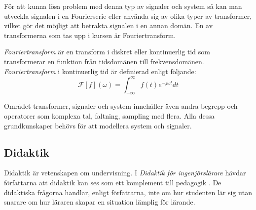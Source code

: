 \documentclass[12pt,a4paper,twoside,openright]{article}
\begin{document}
För att kunna lösa problem med denna typ av signaler och system så kan
man utveckla signalen i en Fourierserie eller använda sig av olika
typer av transformer, vilket gör det möjligt att betrakta signalen i
en annan domän. %
En av transformerna som tas upp i kursen är Fouriertransform.


\textit{Fouriertransform} är en transform i diskret eller
kontinuerlig tid som transformerar en funktion från tidsdomänen till
frekvensdomänen. \textit{Fouriertransform} i kontinuerlig tid är
definierad enligt följande:
\[\mathcal{F}[f] (\omega)
= \int_{-\infty}^{\infty} f(t) e^{-j \omega t} dt\]






Området transformer, signaler och system innehåller även andra begrepp
och operatorer som komplexa tal, faltning, sampling med flera. Alla
dessa grundkunskaper behövs för att modellera system och signaler.

\subsection{Didaktik}
\label{sec:didaktik}
Didaktik är vetenskapen om undervisning. I \textit{Didaktik för
 ingenjörslärare} hävdar författarna att didaktik kan ses som ett
komplement till pedagogik \cite{didaktik_for_ingenjorslarare}. De didaktiska frågorna handlar, enligt
författarna, inte om hur studenten lär sig utan snarare om hur läraren
skapar en situation lämplig för lärande.
\end{document}
